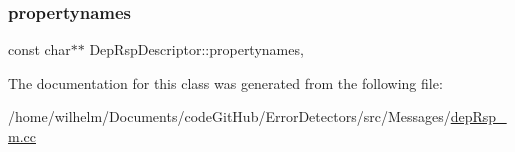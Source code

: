 \subsubsection{\texorpdfstring{propertynames}{propertynames}}
{\footnotesize\ttfamily const char$\ast$$\ast$ Dep\+Rsp\+Descriptor\+::propertynames\hspace{0.3cm}{\ttfamily [mutable]}, {\ttfamily [private]}}



The documentation for this class was generated from the following file\+:\begin{DoxyCompactItemize}
\item 
/home/wilhelm/\+Documents/code\+Git\+Hub/\+Error\+Detectors/src/\+Messages/\hyperlink{dep_rsp__m_8cc}{dep\+Rsp\+\_\+m.\+cc}\end{DoxyCompactItemize}
